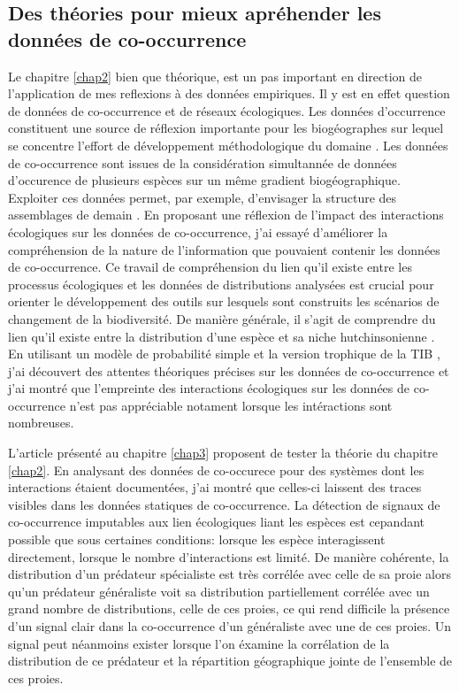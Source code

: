 \subsection*{Des théories pour mieux apréhender les données de
co-occurrence}\label{des-thuxe9ories-pour-mieux-apruxe9hender-les-donnuxe9es-de-co-occurrence}

Le chapitre \ref{chap2} bien que théorique, est un pas important en
direction de l'application de mes reflexions à des données empiriques.
Il y est en effet question de données de co-occurrence et de réseaux
écologiques. Les données d'occurrence constituent une source de
réflexion importante pour les biogéographes sur lequel se concentre
l'effort de développement méthodologique du domaine
\citep{Elith2006, Phillips2006, Pollock2014}. Les données de
co-occurrence sont issues de la considération simultannée de données
d'occurence de plusieurs espèces sur un même gradient biogéographique.
Exploiter ces données permet, par exemple, d'envisager la structure des
assemblages de demain \citep{Albouy2012}. En proposant une réflexion de
l'impact des interactions écologiques sur les données de co-occurrence,
j'ai essayé d'améliorer la compréhension de la nature de l'information
que pouvaient contenir les données de co-occurrence. Ce travail de
compréhension du lien qu'il existe entre les processus écologiques et
les données de distributions analysées est crucial pour orienter le
développement des outils sur lesquels sont construits les scénarios de
changement de la biodiversité. De manière générale, il s'agit de
comprendre du lien qu'il existe entre la distribution d'une espèce et sa
niche hutchinsonienne \citep{Pulliam2000, Godsoe2010a}. En utilisant un
modèle de probabilité simple et la version trophique de la TIB
\citep{Gravel2011}, j'ai découvert des attentes théoriques précises sur
les données de co-occurrence et j'ai montré que l'empreinte des
interactions écologiques sur les données de co-occurrence n'est pas
appréciable notament lorsque les intéractions sont nombreuses.

L'article présenté au chapitre \ref{chap3} proposent de tester la
théorie du chapitre \ref{chap2}. En analysant des données de co-occurece
pour des systèmes dont les interactions étaient documentées, j'ai montré
que celles-ci laissent des traces visibles dans les données statiques de
co-occurrence. La détection de signaux de co-occurrence imputables aux
lien écologiques liant les espèces est cepandant possible que sous
certaines conditions: lorsque les espèce interagissent directement,
lorsque le nombre d'interactions est limité. De manière cohérente, la
distribution d'un prédateur spécialiste est très corrélée avec celle de
sa proie alors qu'un prédateur généraliste voit sa distribution
partiellement corrélée avec un grand nombre de distributions, celle de
ces proies, ce qui rend difficile la présence d'un signal clair dans la
co-occurrence d'un généraliste avec une de ces proies. Un signal peut
néanmoins exister lorsque l'on éxamine la corrélation de la distribution
de ce prédateur et la répartition géographique jointe de l'ensemble de
ces proies.


